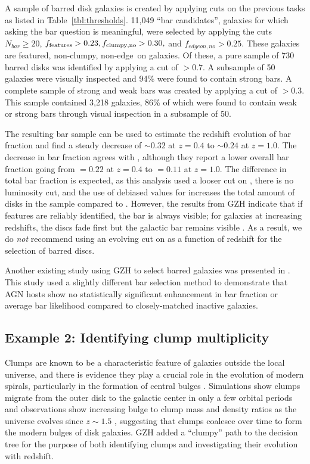 \documentclass[twocolumn]{aastex6}
\begin{document}
A sample of barred disk galaxies is created by applying cuts on the previous
tasks as listed in Table~\ref{tbl:thresholds}. 11,049 ``bar candidates'',
galaxies for which asking the bar question is meaningful, were selected by
applying the cuts $N_{bar} \ge 20$, $f_{\rm features}>0.23, f_{\rm clumpy,no} >
0.30,$ and $f_{edgeon,no}>0.25$. These galaxies are featured, non-clumpy,
non-edge~on galaxies. Of these, a pure sample of 730 barred disks was
identified by applying a cut of \fbar$>0.7$. A subsample of 50 galaxies were
visually inspected and 94\% were found to contain strong bars. A complete
sample of strong and weak bars was created by applying a cut of \fbar$>0.3$.
This sample contained 3,218 galaxies, 86\% of which were found to contain weak
or strong bars through visual inspection in a subsample of 50.

The resulting bar sample can be used to estimate the redshift evolution of bar
fraction and find a steady decrease of \fbar$\sim 0.32$ at $z=0.4$ to
\fbar$\sim 0.24$ at $z=1.0$. The decrease in bar fraction agrees with
\citet{mel14}, although they report a lower overall bar fraction going from
\fbar$=0.22$ at $z=0.4$ to \fbar$=0.11$ at $z=1.0$. The difference in total bar
fraction is expected, as this analysis used a looser cut on \fbar, there is no
luminosity cut, and the use of debiased values for \ffeatures{} increases the
total amount of disks in the sample compared to \citet{mel14}. However, the
results from GZH indicate that if features are reliably identified, the bar is
always visible; for galaxies at increasing redshifts, the discs fade first but
the galactic bar remains visible \citep{mel16}. As a result, we do \emph{not}
recommend using an evolving cut on \fbar{} as a function of redshift for the
selection of barred discs. 

Another existing study using GZH to select barred galaxies was presented in
\citet{che15}. This study used a slightly different bar selection method to
demonstrate that AGN hosts show no statistically significant enhancement in bar
fraction or average bar likelihood compared to closely-matched inactive
galaxies. 

\subsection{Example 2: Identifying clump multiplicity} Clumps are known to be a
characteristic feature of galaxies outside the local universe, and there is
evidence they play a crucial role in the evolution of modern spirals,
particularly in the formation of central bulges
\citep{elm05,elm14,guo15,beh16}. Simulations show clumps migrate from the outer
disk to the galactic center in only a few orbital periods \citep{man15} and
observations show increasing bulge to clump mass and density ratios as the
universe evolves since $z\sim 1.5$ \citep{elm09}, suggesting that clumps
coalesce over time to form the modern bulges of disk galaxies. GZH added a
``clumpy'' path to the decision tree for the purpose of both identifying clumps
and investigating their evolution with redshift. 
\end{document}
